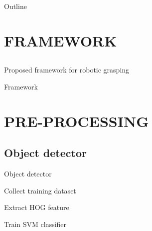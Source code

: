 \documentclass[xcolor=table,compress,blue]{beamer}
\begin{document}
\frame{
    \titlepage
    \thispagestyle{empty}
}
\begin{frame}{Outline}
  \tableofcontents
\end{frame}
 
\section{FRAMEWORK}
\subsection{}
\begin{frame}{Proposed framework for robotic grasping}
	\begin{exampleblock}{Framework}
		
	
	\end{exampleblock}
\end{frame}



\section{PRE-PROCESSING}
\subsection{Object detector}
\begin{frame}{Object detector}
	\begin{exampleblock}{Collect training dataset}

	\end{exampleblock}
	\begin{exampleblock}{Extract HOG feature}

	\end{exampleblock}
	\begin{exampleblock}{Train SVM classifier}

	\end{exampleblock}
\end{frame}
 
\end{document}
